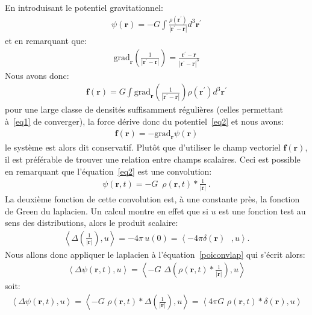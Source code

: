 En introduisant le potentiel gravitationnel:
\begin{align}
	\psi(\mathbf{r})=-G\displaystyle\int\frac{\rho(\mathbf{r}^{\prime})}{\left\vert \mathbf{r}^{\prime}-\mathbf{r}\right\vert }d^{3}\mathbf{r}%
	^{\prime}\label{eq2}%
\end{align}
et en remarquant que:
\begin{align*}
	\mathrm{grad}_{\mathbf{r}}\left(  \frac{1}{\left\vert \mathbf{r}^{\prime}-\mathbf{r}\right\vert }\right)  =\frac{\mathbf{r}^{\prime}-\mathbf{r}%
	}{\left\vert \mathbf{r}^{\prime}-\mathbf{r}\right\vert ^{3}}
\end{align*}
Nous avons donc:
\begin{align*}
	\mathbf{f}(\mathbf{r})=G\displaystyle\int\mathrm{grad}_{\mathbf{r}}\left(\frac{1}{\left\vert \mathbf{r}^{\prime}-\mathbf{r}\right\vert }\right)
	\rho(\mathbf{r}^{\prime})d^{3}\mathbf{r}^{\prime}
\end{align*}
pour une large classe de densités suffisamment régulières (celles permettant à~\ref{eq1} de converger), la force dérive donc du potentiel~\ref{eq2} et
nous avons:
\begin{align}
	\mathbf{f}(\mathbf{r})=-\mathrm{grad}_{\mathbf{r}}\psi(\mathbf{r})\label{eq3}%
\end{align}
le système est alors dit conservatif. Plutôt que d'utiliser le champ vectoriel $\mathbf{f}(\mathbf{r})$, il est préférable de trouver une relation
entre champs scalaires. Ceci est possible en remarquant que l'équation~\ref{eq2} est une convolution:
\begin{align}
	\psi(\mathbf{r},t)=-G\,\,\,\rho(\mathbf{r},t)\ast\frac{1}{\left\vert\mathbf{r}\right\vert }\ .\label{poiconvlap}%
\end{align}
La deuxième fonction de cette convolution est, à une constante près, la fonction de Green du laplacien. Un calcul montre en effet que si
$u$ est une fonction test au sens des distributions, alors le produit scalaire:
\begin{align*}
	\left\langle \Delta\left(  \frac{1}{\left\vert \mathbf{r}\right\vert }\right),u\right\rangle =-4\pi\,u\left(  0\right)  =\left\langle -4\pi\delta\left(
	\mathbf{r}\right)  \text{ },u\right\rangle\text{.}
\end{align*}
Nous allons donc appliquer le laplacien à l'équation~\ref{poiconvlap} qui s'écrit alors:
\begin{align*}
	\left\langle \Delta\psi(\mathbf{r},t),u\right\rangle =\left\langle-G\,\,\Delta\left(  \rho(\mathbf{r},t)\ast\frac{1}{\left\vert \mathbf{r}%
	\right\vert }\right),u\right\rangle
\end{align*}
soit:
\begin{align*}
	\left\langle \Delta\psi(\mathbf{r},t),u\right\rangle =\left\langle-G\,\,\rho(\mathbf{r},t)\ast\Delta\left(  \frac{1}{\left\vert \mathbf{r}%
	\right\vert }\right)  ,u\right\rangle =\left\langle 4\pi G\,\,\rho(\mathbf{r},t)\ast\delta\left(  \mathbf{r}\right)  ,u\right\rangle
\end{align*}

